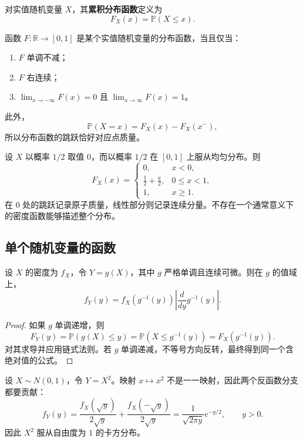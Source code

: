 \begin{definition}[累积分布函数]
对实值随机变量 $X$，其\textbf{累积分布函数}定义为
\[
    F_X(x)=\mathbb{P}(X\leq x).
\]
\end{definition}

\begin{theorem}[分布函数的刻画]
函数 $F:\mathbb{R}\to[0,1]$ 是某个实值随机变量的分布函数，当且仅当：
\begin{enumerate}
    \item $F$ 单调不减；
    \item $F$ 右连续；
    \item $\lim_{x\to-\infty}F(x)=0$ 且 $\lim_{x\to\infty}F(x)=1$。
\end{enumerate}
此外，
\[
    \mathbb{P}(X=x)=F_X(x)-F_X(x^-),
\]
所以分布函数的跳跃恰好对应点质量。
\end{theorem}

\begin{example}[混合分布]
设 $X$ 以概率 $1/2$ 取值 $0$，而以概率 $1/2$ 在 $[0,1]$ 上服从均匀分布。则
\[
F_X(x)=
\begin{cases}
0,&x<0,\\
\frac12+\frac{x}{2},&0\leq x<1,\\
1,&x\geq1.
\end{cases}
\]
在 $0$ 处的跳跃记录原子质量，线性部分则记录连续分量。不存在一个通常意义下的密度函数能够描述整个分布。
\end{example}

\subsection{单个随机变量的函数}

\begin{theorem}[单调变量变换]
设 $X$ 的密度为 $f_X$，令 $Y=g(X)$，其中 $g$ 严格单调且连续可微。则在 $g$ 的值域上，
\[
    f_Y(y)=f_X(g^{-1}(y))
    \left|\frac{d}{dy}g^{-1}(y)\right|.
\]
\end{theorem}

\begin{proof}
如果 $g$ 单调递增，则
\[
    F_Y(y)=\mathbb{P}(g(X)\leq y)
    =\mathbb{P}(X\leq g^{-1}(y))
    =F_X(g^{-1}(y)).
\]
对其求导并应用链式法则。若 $g$ 单调递减，不等号方向反转，最终得到同一个含绝对值的公式。
\end{proof}

\begin{example}[标准正态随机变量的平方]
设 $X\sim N(0,1)$，令 $Y=X^2$。映射 $x\mapsto x^2$ 不是一一映射，因此两个反函数分支都要贡献：
\[
    f_Y(y)
    =\frac{f_X(\sqrt y)}{2\sqrt y}
     +\frac{f_X(-\sqrt y)}{2\sqrt y}
    =\frac{1}{\sqrt{2\pi y}}e^{-y/2},
    \qquad y>0.
\]
因此 $X^2$ 服从自由度为 $1$ 的卡方分布。
\end{example}

